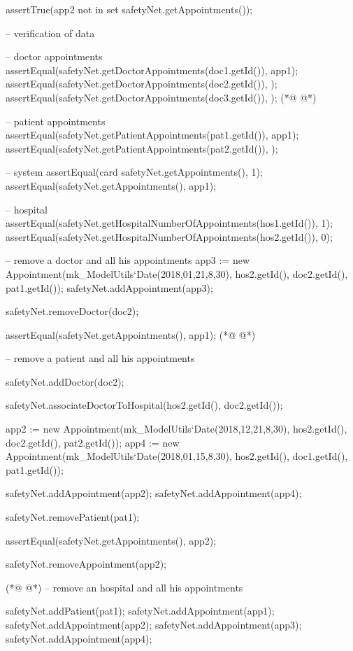 \begin{vdmpp}[breaklines=true]
  assertTrue(app2 not in set safetyNet.getAppointments());
  
  -- verification of data
  
  -- doctor appointments
  assertEqual(safetyNet.getDoctorAppointments(doc1.getId()), {app1});
  assertEqual(safetyNet.getDoctorAppointments(doc2.getId()), {});
  assertEqual(safetyNet.getDoctorAppointments(doc3.getId()), {});
(*@
\label{testAddAgreement:784}
@*)
  
  -- patient appointments
  assertEqual(safetyNet.getPatientAppointments(pat1.getId()), {app1});
  assertEqual(safetyNet.getPatientAppointments(pat2.getId()), {});

  -- system
  assertEqual(card safetyNet.getAppointments(), 1);
  assertEqual(safetyNet.getAppointments(), {app1});
  
  -- hospital
  assertEqual(safetyNet.getHospitalNumberOfAppointments(hos1.getId()), 1);
  assertEqual(safetyNet.getHospitalNumberOfAppointments(hos2.getId()), 0);  


  -- remove a doctor and all his appointments
  app3 := new Appointment(mk_ModelUtils`Date(2018,01,21,8,30), hos2.getId(), doc2.getId(), pat1.getId());
  safetyNet.addAppointment(app3);
  
  safetyNet.removeDoctor(doc2);
  
  assertEqual(safetyNet.getAppointments(), {app1}); 
(*@
\label{testRemoveAgreement:805}
@*)
  
  
  -- remove a patient and all his appointments
  
  safetyNet.addDoctor(doc2);
  
  safetyNet.associateDoctorToHospital(hos2.getId(), doc2.getId());
    
  app2 := new Appointment(mk_ModelUtils`Date(2018,12,21,8,30), hos2.getId(), doc2.getId(), pat2.getId());
  app4 := new Appointment(mk_ModelUtils`Date(2018,01,15,8,30), hos2.getId(), doc1.getId(), pat1.getId());
  
  safetyNet.addAppointment(app2);
  safetyNet.addAppointment(app4);
  
  safetyNet.removePatient(pat1);
  
  assertEqual(safetyNet.getAppointments(), {app2}); 
  
  safetyNet.removeAppointment(app2);
  
(*@
\label{testAddObservation:825}
@*)
  -- remove an hospital and all his appointments
  
  safetyNet.addPatient(pat1);
  safetyNet.addAppointment(app1);
  safetyNet.addAppointment(app2);
  safetyNet.addAppointment(app3);
  safetyNet.addAppointment(app4);
  

\end{vdmpp}
